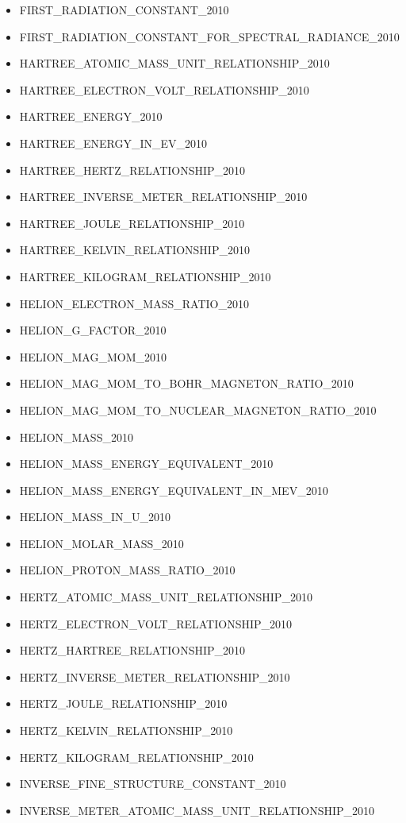 \begin{itemize}
\item
  FIRST\_RADIATION\_CONSTANT\_2010
\item
  FIRST\_RADIATION\_CONSTANT\_FOR\_SPECTRAL\_RADIANCE\_2010
\item
  HARTREE\_ATOMIC\_MASS\_UNIT\_RELATIONSHIP\_2010
\item
  HARTREE\_ELECTRON\_VOLT\_RELATIONSHIP\_2010
\item
  HARTREE\_ENERGY\_2010
\item
  HARTREE\_ENERGY\_IN\_EV\_2010
\item
  HARTREE\_HERTZ\_RELATIONSHIP\_2010
\item
  HARTREE\_INVERSE\_METER\_RELATIONSHIP\_2010
\item
  HARTREE\_JOULE\_RELATIONSHIP\_2010
\item
  HARTREE\_KELVIN\_RELATIONSHIP\_2010
\item
  HARTREE\_KILOGRAM\_RELATIONSHIP\_2010
\item
  HELION\_ELECTRON\_MASS\_RATIO\_2010
\item
  HELION\_G\_FACTOR\_2010
\item
  HELION\_MAG\_MOM\_2010
\item
  HELION\_MAG\_MOM\_TO\_BOHR\_MAGNETON\_RATIO\_2010
\item
  HELION\_MAG\_MOM\_TO\_NUCLEAR\_MAGNETON\_RATIO\_2010
\item
  HELION\_MASS\_2010
\item
  HELION\_MASS\_ENERGY\_EQUIVALENT\_2010
\item
  HELION\_MASS\_ENERGY\_EQUIVALENT\_IN\_MEV\_2010
\item
  HELION\_MASS\_IN\_U\_2010
\item
  HELION\_MOLAR\_MASS\_2010
\item
  HELION\_PROTON\_MASS\_RATIO\_2010
\item
  HERTZ\_ATOMIC\_MASS\_UNIT\_RELATIONSHIP\_2010
\item
  HERTZ\_ELECTRON\_VOLT\_RELATIONSHIP\_2010
\item
  HERTZ\_HARTREE\_RELATIONSHIP\_2010
\item
  HERTZ\_INVERSE\_METER\_RELATIONSHIP\_2010
\item
  HERTZ\_JOULE\_RELATIONSHIP\_2010
\item
  HERTZ\_KELVIN\_RELATIONSHIP\_2010
\item
  HERTZ\_KILOGRAM\_RELATIONSHIP\_2010
\item
  INVERSE\_FINE\_STRUCTURE\_CONSTANT\_2010
\item
  INVERSE\_METER\_ATOMIC\_MASS\_UNIT\_RELATIONSHIP\_2010

\end{itemize}
